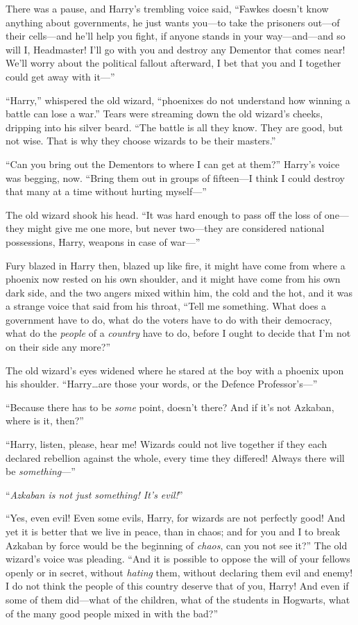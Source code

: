 There was a pause, and Harry’s trembling voice said, “Fawkes doesn’t know
anything about governments, he just wants you—to take the prisoners out—of
their cells—and he’ll help you fight, if anyone stands in your
way—and—and so will I, Headmaster! I’ll go with you and destroy any
Dementor that comes near! We’ll worry about the political fallout afterward, I
bet that you and I together could get away with it—”

“Harry,” whispered the old wizard, “phoenixes do not understand how winning a
battle can lose a war.” Tears were streaming down the old wizard’s cheeks,
dripping into his silver beard. “The battle is all they know. They are good,
but not wise. That is why they choose wizards to be their masters.”

“Can you bring out the Dementors to where I can get at them?” Harry’s voice was
begging, now. “Bring them out in groups of fifteen—I think I could destroy
that many at a time without hurting myself—”

The old wizard shook his head. “It was hard enough to pass off the loss of
one—they might give me one more, but never two—they are considered national
possessions, Harry, weapons in case of war—”

Fury blazed in Harry then, blazed up like fire, it might have come from where a
phoenix now rested on his own shoulder, and it might have come from his own
dark side, and the two angers mixed within him, the cold and the hot, and it
was a strange voice that said from his throat, “Tell me something. What does a
government have to do, what do the voters have to do with their democracy, what
do the \emph{people} of a \emph{country} have to do, before I ought to decide
that I’m not on their side any more?”

The old wizard’s eyes widened where he stared at the boy with a phoenix upon
his shoulder. “Harry…are those your words, or the Defence
Professor’s—”

“Because there has to be \emph{some} point, doesn’t there? And if it’s not
Azkaban, where is it, then?”

“Harry, listen, please, hear me! Wizards could not live together if they each
declared rebellion against the whole, every time they differed! Always there
will be \emph{something}—”

“\emph{Azkaban is not just something! It’s evil!}”

“Yes, even evil! Even some evils, Harry, for wizards are not perfectly good!
And yet it is better that we live in peace, than in chaos; and for you and I to
break Azkaban by force would be the beginning of \emph{chaos}, can you not see
it?” The old wizard’s voice was pleading. “And it is possible to oppose the
will of your fellows openly or in secret, without \emph{hating} them, without
declaring them evil and enemy! I do not think the people of this country
deserve that of you, Harry! And even if some of them did—what of the
children, what of the students in Hogwarts, what of the many good people mixed
in with the bad?”

